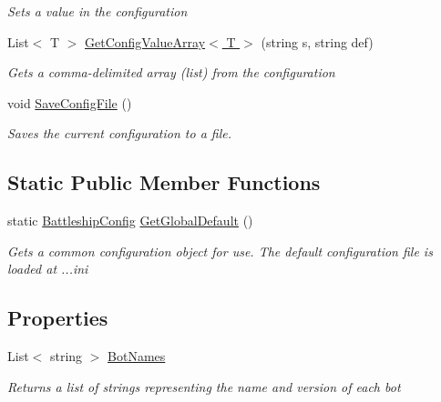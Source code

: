\begin{DoxyCompactItemize}
\begin{DoxyCompactList}\small\item\em Sets a value in the configuration\end{DoxyCompactList}\item 
List$<$ T $>$ \hyperlink{class_m_b_c_1_1_core_1_1_battleship_config_a96bc0edc77fd0c2a32049047eec39a3b}{Get\-Config\-Value\-Array$<$ T $>$} (string s, string def)
\begin{DoxyCompactList}\small\item\em Gets a comma-\/delimited array (list) from the configuration\end{DoxyCompactList}\item 
void \hyperlink{class_m_b_c_1_1_core_1_1_battleship_config_a975299c48d115848adc7cf65b0c07c35}{Save\-Config\-File} ()
\begin{DoxyCompactList}\small\item\em Saves the current configuration to a file.\end{DoxyCompactList}\end{DoxyCompactItemize}
\subsection*{Static Public Member Functions}
\begin{DoxyCompactItemize}
\item 
\hypertarget{class_m_b_c_1_1_core_1_1_battleship_config_aaa19676a26e190f562c8d7be70bc8b83}{static \hyperlink{class_m_b_c_1_1_core_1_1_battleship_config}{Battleship\-Config} \hyperlink{class_m_b_c_1_1_core_1_1_battleship_config_aaa19676a26e190f562c8d7be70bc8b83}{Get\-Global\-Default} ()}\label{class_m_b_c_1_1_core_1_1_battleship_config_aaa19676a26e190f562c8d7be70bc8b83}

\begin{DoxyCompactList}\small\item\em Gets a common configuration object for use. The default configuration file is loaded at ...ini\end{DoxyCompactList}\end{DoxyCompactItemize}
\subsection*{Properties}
\begin{DoxyCompactItemize}
\item 
\hypertarget{class_m_b_c_1_1_core_1_1_battleship_config_aa6522b82ad509e097803ccd8833fd298}{List$<$ string $>$ \hyperlink{class_m_b_c_1_1_core_1_1_battleship_config_aa6522b82ad509e097803ccd8833fd298}{Bot\-Names}}\label{class_m_b_c_1_1_core_1_1_battleship_config_aa6522b82ad509e097803ccd8833fd298}

\begin{DoxyCompactList}\small\item\em Returns a list of strings representing the name and version of each bot\end{DoxyCompactList}\end{DoxyCompactItemize}


